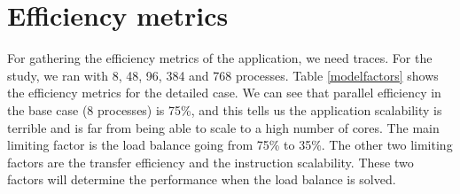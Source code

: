 \section{Efficiency metrics}

For gathering the efficiency metrics of the application, we need traces. For the study, we ran with 8, 48, 96, 384 and 768 processes. Table \ref{modelfactors} shows the efficiency metrics for the detailed case. We can see that parallel efficiency in the base case (8 processes) is 75\%, and this tells us the application scalability is terrible and is far from being able to scale to a high number of cores.  The main limiting factor is the load balance going from 75\% to 35\%. The other two limiting factors are the transfer efficiency and the instruction scalability. These two factors will determine the performance when the load balance is solved.


